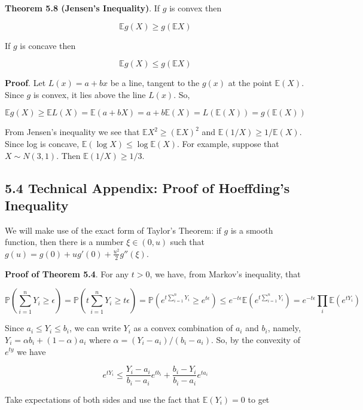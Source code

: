 \textbf{Theorem 5.8 (Jensen's Inequality)}. If \(g\) is convex then

\[ \mathbb{E}g(X) \geq g(\mathbb{E}X) \]

If \(g\) is concave then

\[ \mathbb{E}g(X) \leq g(\mathbb{E}X) \]

\textbf{Proof}. Let \(L(x) = a + bx\) be a line, tangent to the \(g(x)\)
at the point \(\mathbb{E}(X)\). Since \(g\) is convex, it lies above the
line \(L(x)\). So,

\[ \mathbb{E}g(X) \geq \mathbb{E}L(X) = \mathbb{E}(a + bX) = a + b\mathbb{E}(X) = L(\mathbb{E}(X)) = g(\mathbb{E}(X))\]

From Jensen's inequality we see that
\(\mathbb{E}X^{2} \geq (\mathbb{E}X)^{2}\) and
\(\mathbb{E}(1/X) \geq 1 / \mathbb{E}(X)\). Since log is concave,
\(\mathbb{E}(\log X) \leq \log \mathbb{E}(X)\). For example, suppose
that \(X \sim N(3, 1)\). Then \(\mathbb{E}(1 / X) \geq 1/3\).

\subsection*{5.4 Technical Appendix: Proof of Hoeffding's Inequality}\label{technical:appendix:hoeffdings}

We will make use of the exact form of Taylor's Theorem: if \(g\) is a
smooth function, then there is a number \(\xi \in (0, u)\) such that
\(g(u) = g(0) + u g'(0) + \frac{u^{2}}{2}g''(\xi)\).

\textbf{Proof of Theorem 5.4}. For any \(t > 0\), we have, from Markov's
inequality, that

\[ \mathbb{P}\left( \sum_{i=1}^{n} Y_{i} \geq \epsilon \right) = \mathbb{P}\left( t \sum_{i=1}^{n} Y_{i} \geq t \epsilon \right)
= \mathbb{P}\left( e^{t \sum_{i=1}^{n} Y_{i}} \geq e^{t \epsilon} \right) \leq e^{-t\epsilon} \mathbb{E}\left( e^{t \sum_{i=1}^{n} Y_{i}}\right) = e^{-t\epsilon} \prod_{i} \mathbb{E}\left(e^{tY_{i}}\right) \]

Since \(a_{i} \leq Y_{i} \leq b_{i}\), we can write \(Y_{i}\) as a convex
combination of \(a_{i}\) and \(b_{i}\), namely,
\(Y_{i} = \alpha b_{i} + (1 - \alpha) a_{i}\) where
\(\alpha = (Y_{i} - a_{i}) / (b_{i} - a_{i})\). So, by the convexity of
\(e^{ty}\) we have

\[ e^{tY_{i}} \leq \frac{Y_{i} - a_{i}}{b_{i} - a_{i}} e^{tb_{i}} + \frac{b_{i} - Y_{i}}{b_{i} - a_{i}} e^{ta_{i}} \]

Take expectations of both sides and use the fact that
\(\mathbb{E}(Y_{i}) = 0\) to get

